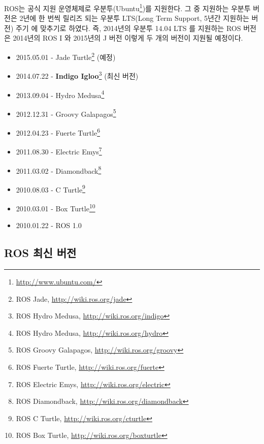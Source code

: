 ROS는 공식 지원 운영체제로 우분투(Ubuntu\footnote{\url{http://www.ubuntu.com/}})를 지원한다. 그 중 지원하는 우분투 버전은 2년에 한 번씩 릴리즈 되는 우분투 LTS(Long Term Support, 5년간 지원하는 버전) 주기 에 맞추기로 하였다. 즉, 2014년의 우분투 14.04 LTS 를 지원하는 ROS 버전은 2014년의 ROS I 와 2015년의 J 버전 이렇게 두 개의 버전이 지원될 예정이다.\\

\begin{itemize}
\item 2015.05.01 - Jade Turtle\footnote{ROS Jade, \url{http://wiki.ros.org/jade}} (예정)
\item 2014.07.22 - \textbf{Indigo Igloo}\footnote{ROS Hydro Medusa, \url{http://wiki.ros.org/indigo}} (최신 버전)
\item 2013.09.04 - Hydro Medusa\footnote{ROS Hydro Medusa, \url{http://wiki.ros.org/hydro}}
\item 2012.12.31 - Groovy Galapagos\footnote{ROS Groovy Galapagos, \url{http://wiki.ros.org/groovy}}
\item 2012.04.23 - Fuerte Turtle\footnote{ROS Fuerte Turtle, \url{http://wiki.ros.org/fuerte}}
\item 2011.08.30 - Electric Emys\footnote{ROS Electric Emys, \url{http://wiki.ros.org/electric}}
\item 2011.03.02 - Diamondback\footnote{ROS Diamondback, \url{http://wiki.ros.org/diamondback}}
\item 2010.08.03 - C Turtle\footnote{ROS C Turtle, \url{http://wiki.ros.org/cturtle}}
\item 2010.03.01 - Box Turtle\footnote{ROS Box Turtle, \url{http://wiki.ros.org/boxturtle}}
\item 2010.01.22 - ROS 1.0
\end{itemize}

\subsection{ROS 최신 버전}

